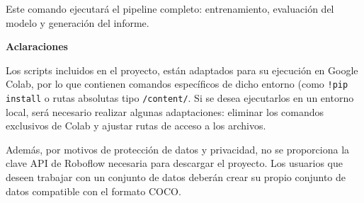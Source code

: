 \begin{itemize}
   Este comando ejecutará el pipeline completo: entrenamiento, evaluación del modelo y generación del informe.

    \textbf{Aclaraciones}
    
    Los scripts incluidos en el proyecto, están adaptados para su ejecución en Google Colab, por lo que contienen comandos específicos de dicho entorno (como \texttt{!pip install} o rutas absolutas tipo \texttt{/content/}. Si se desea ejecutarlos en un entorno local, será necesario realizar algunas adaptaciones: eliminar los comandos exclusivos de Colab y ajustar rutas de acceso a los archivos.

    Además, por motivos de protección de datos y privacidad, no se proporciona la clave API de Roboflow necesaria para descargar el proyecto. Los usuarios que deseen trabajar con un conjunto de datos deberán crear su propio conjunto de datos compatible con el formato COCO. 
   
\end{itemize}



    
     